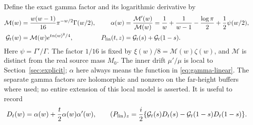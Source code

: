 Define the exact gamma factor and its logarithmic derivative by
\begin{align}
 \mathcal M(w)&=\frac{w(w-1)}{16}\pi^{-w/2}\Gamma(w/2),&
 \alpha(w)&=\frac{\mathcal M'(w)}{\mathcal M(w)}
 =\frac1w+\frac1{w-1}-\frac{\log\pi}{2}+\frac12\psi(w/2),\notag\\
 \mathcal G_t(w)&=\mathcal M(w)e^{t\alpha(w)^2/4},&
 P_{\rm lin}(t,z)&=\mathcal G_t(s)+\mathcal G_t(1-s).
 \label{eq:gamma-linear}
\end{align}
Here $\psi=\Gamma'/\Gamma$.  The factor $1/16$ is fixed by
$\xi(w)/8=\mathcal M(w)\zeta(w)$, and $\mathcal M$ is distinct from
the real source mass $M_0$.  The inner drift $\mu'/\mu$ is local to
Section~\ref{sec:explicit}; $\alpha$ here always means the function
in \eqref{eq:gamma-linear}.  The separate gamma factors are
holomorphic and nonzero on the far-height buffers where used; no entire
extension of this local model is asserted.  It is useful to record
\begin{equation}
 D_t(w)=\alpha(w)+\frac t2\alpha(w)\alpha'(w),\qquad
 (P_{\rm lin})_z=\frac i2\{
 \mathcal G_t(s)D_t(s)-\mathcal G_t(1-s)D_t(1-s)\}.
 \label{eq:linear-derivative}
\end{equation}

